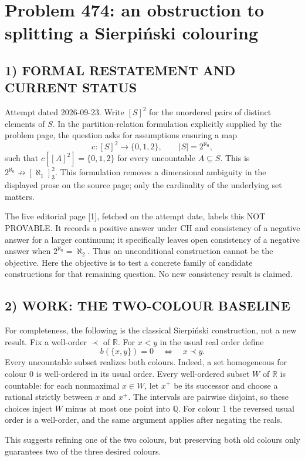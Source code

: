 \section{Problem 474: an obstruction to splitting a Sierpi\'nski colouring}
\subsection*{1) FORMAL RESTATEMENT AND CURRENT STATUS}
Attempt dated 2026-09-23. Write $[S]^2$ for the unordered pairs of distinct elements of $S$. In the partition-relation formulation explicitly supplied by the problem page, the question asks for assumptions ensuring a map
\[
c:[S]^2\longrightarrow\{0,1,2\},\qquad |S|=2^{\aleph_0},
\]
such that $c[[A]^2]=\{0,1,2\}$ for every uncountable $A\subseteq S$. This is $2^{\aleph_0}\not\to[\aleph_1]^2_3$. This formulation removes a dimensional ambiguity in the displayed prose on the source page; only the cardinality of the underlying set matters.

The live editorial page [1], fetched on the attempt date, labels this NOT PROVABLE. It records a positive answer under CH and consistency of a negative answer for a larger continuum; it specifically leaves open consistency of a negative answer when $2^{\aleph_0}=\aleph_2$. Thus an unconditional construction cannot be the objective. Here the objective is to test a concrete family of candidate constructions for that remaining question. No new consistency result is claimed.

\subsection*{2) WORK: THE TWO-COLOUR BASELINE}
For completeness, the following is the classical Sierpi\'nski construction, not a new result. Fix a well-order $\prec$ of $\mathbb R$. For $x<y$ in the usual real order define
\[
b(\{x,y\})=0\quad\Longleftrightarrow\quad x\prec y.
\]
Every uncountable subset realizes both colours. Indeed, a set homogeneous for colour 0 is well-ordered in its usual order. Every well-ordered subset $W$ of $\mathbb R$ is countable: for each nonmaximal $x\in W$, let $x^+$ be its successor and choose a rational strictly between $x$ and $x^+$. The intervals are pairwise disjoint, so these choices inject $W$ minus at most one point into $\mathbb Q$. For colour 1 the reversed usual order is a well-order, and the same argument applies after negating the reals.

This suggests refining one of the two colours, but preserving both old colours only guarantees two of the three desired colours.


